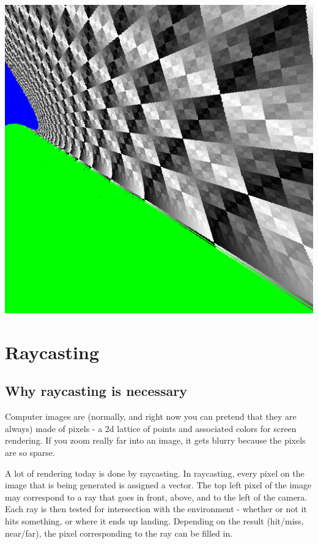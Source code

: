 

\usepackage[backend=biber]{biblatex}




\includegraphics[width=\columnwidth]{sqrt.png}

\section*{Raycasting}

\subsection*{Why raycasting is necessary}

Computer images are (normally, and right now you can pretend that they are always) made of pixels - a 2d lattice of points and associated colors for screen rendering.  If you zoom really far into an image, it gets blurry because the pixels are so sparse.

A lot of rendering today is done by raycasting.  In raycasting, every pixel on the image that is being generated is assigned a vector.  The top left pixel of the image may correspond to a ray that goes in front, above, and to the left of the camera.  Each ray is then tested for intersection with the environment - whether or not it hits something, or where it ends up landing.  Depending on the result (hit/miss, near/far), the pixel corresponding to the ray can be filled in.

